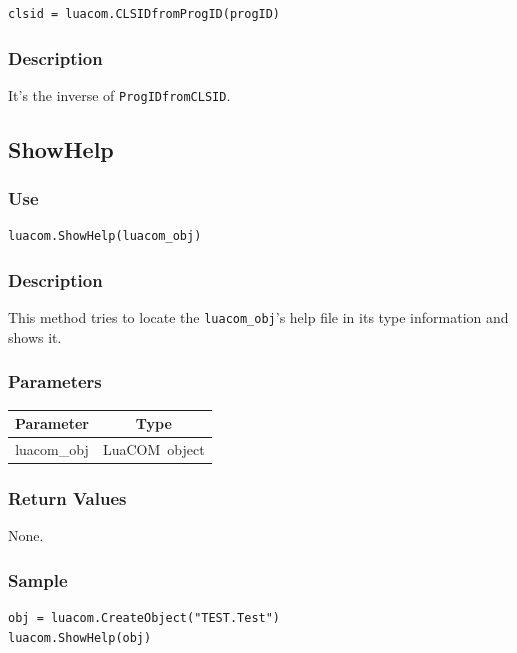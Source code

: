 \documentclass[11pt,a4paper,english]{report}
\newcommand{\ident}[1]{\mbox{\texttt{#1}}}
\newcommand{\techname}[1]{\mbox{#1}}
\newcommand{\luacom}{\techname{LuaCOM}}
\begin{document}
\begin{verbatim}
clsid = luacom.CLSIDfromProgID(progID)
\end{verbatim}

\subsubsection*{Description}
It's the inverse of \verb+ProgIDfromCLSID+.


\subsection*{ShowHelp}

\subsubsection*{Use}

\begin{verbatim}
luacom.ShowHelp(luacom_obj)
\end{verbatim}

\subsubsection*{Description}
This method tries to locate the \ident{luacom\_obj}'s help file in its
type information and shows it.

\subsubsection*{Parameters}

\begin{tabular}{|c|c|}
\hline
\bf Parameter & \bf Type  \\ \hline \hline
luacom\_obj & \luacom\ object  \\ \hline
\end{tabular}

\subsubsection*{Return Values}
None.

\subsubsection*{Sample}
\begin{verbatim}
obj = luacom.CreateObject("TEST.Test")
luacom.ShowHelp(obj)
\end{verbatim}
\end{document}
